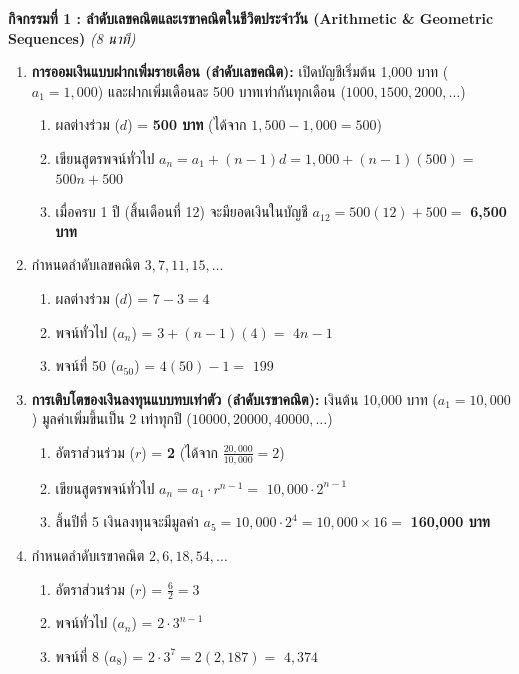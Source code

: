 \documentclass[a4paper,12pt]{article}
\newcommand{\ans}[1]{\textbf{\color{ans}#1}}
\begin{document}
\noindent\textbf{กิจกรรมที่ 1 : ลำดับเลขคณิตและเรขาคณิตในชีวิตประจำวัน (Arithmetic \& Geometric Sequences)} \hfill \textit{(8 นาที)}
\begin{enumerate}[label=\arabic*)]
  \item \textbf{การออมเงินแบบฝากเพิ่มรายเดือน (ลำดับเลขคณิต):} เปิดบัญชีเริ่มต้น 1,000 บาท ($a_1 = 1,000$) และฝากเพิ่มเดือนละ 500 บาทเท่ากันทุกเดือน ($1000, 1500, 2000, \dots$)
        \begin{enumerate}[label=(\alph*),itemsep=1pt]
          \item ผลต่างร่วม ($d$) = \ans{500 บาท} (ได้จาก $1,500 - 1,000 = 500$)
          \item เขียนสูตรพจน์ทั่วไป $a_n = a_1 + (n-1)d = 1,000 + (n-1)(500) =$ \ans{$500n + 500$}
          \item เมื่อครบ 1 ปี (สิ้นเดือนที่ 12) จะมียอดเงินในบัญชี $a_{12} = 500(12) + 500 =$ \ans{6,500 บาท}
        \end{enumerate}
  \item กำหนดลำดับเลขคณิต $3, 7, 11, 15, \dots$
        \begin{enumerate}[label=(\alph*),itemsep=1pt]
          \item ผลต่างร่วม ($d$) = \ans{$7 - 3 = 4$}
          \item พจน์ทั่วไป ($a_n$) = $3 + (n-1)(4) =$ \ans{$4n - 1$}
          \item พจน์ที่ 50 ($a_{50}$) = $4(50) - 1 =$ \ans{$199$}
        \end{enumerate}
  \item \textbf{การเติบโตของเงินลงทุนแบบทบเท่าตัว (ลำดับเรขาคณิต):} เงินต้น 10,000 บาท ($a_1 = 10,000$) มูลค่าเพิ่มขึ้นเป็น 2 เท่าทุกปี ($10000, 20000, 40000, \dots$)
        \begin{enumerate}[label=(\alph*),itemsep=1pt]
          \item อัตราส่วนร่วม ($r$) = \ans{2} (ได้จาก $\frac{20,000}{10,000} = 2$)
          \item เขียนสูตรพจน์ทั่วไป $a_n = a_1 \cdot r^{n-1} =$ \ans{$10,000 \cdot 2^{n-1}$}
          \item สิ้นปีที่ 5 เงินลงทุนจะมีมูลค่า $a_5 = 10,000 \cdot 2^4 = 10,000 \times 16 =$ \ans{160,000 บาท}
        \end{enumerate}
  \item กำหนดลำดับเรขาคณิต $2, 6, 18, 54, \dots$
        \begin{enumerate}[label=(\alph*),itemsep=1pt]
          \item อัตราส่วนร่วม ($r$) = \ans{$\frac{6}{2} = 3$}
          \item พจน์ทั่วไป ($a_n$) = \ans{$2 \cdot 3^{n-1}$}
          \item พจน์ที่ 8 ($a_8$) = $2 \cdot 3^7 = 2(2,187) =$ \ans{$4,374$}
        \end{enumerate}
\end{enumerate}
\vspace{0.2em}
\end{document}
